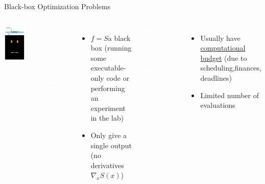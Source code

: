 \documentclass[handout,aspectratio=54]{beamer}
\numberwithin{theorem}{section}
\begin{document}
\begin{frame}{Black-box Optimization Problems}
\begin{columns}
\includegraphics[width=\textwidth]{fig/12-1.jpg}

\small{
\colorbox[rgb]{0.5,0.6,0.7}{\textcolor{white}{Only knowledge about $f$ is obtained by sampling}}
}
\begin{itemize}\small
\item $f=S$\;a black box (running some executable-only code or performing an experiment in the lab)
\item Only give a single output (no derivatives $\nabla_x S(x)$)
\end{itemize}

\small{
\colorbox[rgb]{0.5,0.6,0.7}{\textcolor{white}{Good solutions guaranteed in the limit, but:}}
}
\begin{itemize}\small
\item Usually have \underline{computational budget} (due to scheduling,finances, deadlines)
\item Limited number of evaluations
\end{itemize}
\end{columns}
\end{frame}
\end{document}
